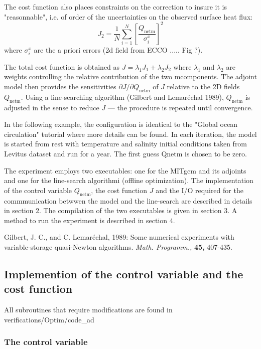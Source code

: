 The cost function also places constraints on the correction to insure it is
"reasonnable", i.e. of order of the uncertainties on the observed surface heat
flux: 
\begin{equation}
J_2 = \frac{1}{N} \sum_{i=1}^N \left[\frac{Q_\mathrm{netm}}{\sigma^x_i} \right]^2
\end{equation}
where $\sigma^x_i$ are the a priori errors (2d field from ECCO ..... Fig ?).

The total cost function is obtained as $J=\lambda_1 J_1+ \lambda_2 J_2$ where
$\lambda_1$ and $\lambda_2$ are weights controlling the relative contribution
of the two mcomponents. The adjoint model then provides the sensitivities
$\partial J/\partial Q_\mathrm{netm}$ of $J$ relative to the 2D fields
$Q_\mathrm{netm}$. Using a line-searching algorithm (Gilbert and Lemar\'{e}chal 1989),
$Q_\mathrm{netm}$ is adjusted in the sense to reduce $J$ --- the procedure is 
repeated until convergence.

In the following example, the configuration is identical to the "Global ocean circulation"
tutorial where more details can be found. In each iteration, the model is started from
rest with temperature and salinity initial conditions taken from Levitus dataset and run
for a year. The first guess Qnetm is chosen to be zero.

The experiment employs two executables: one for the MITgcm and its adjoints and 
one for the line-search algorithmi (offline optimization). The implementation of
the control variable $Q_\mathrm{netm}$, the cost function $J$ and the I/O required
for the commmunication betwwen the model and the line-search are described in details 
in section 2. The compilation of the two executables is given in section 3.
A method to run the experiment is described in section 4.

Gilbert, J. C., and C. Lemar\'echal, 1989: Some numerical experiments with
variable-storage quasi-Newton algorithms. \textit{Math. Programm.,}
\textbf{45,} 407-435.

\subsection{Implemention of the control variable and the cost function}

All subroutines that require modifications are found in verifications/Optim/code\_ad

\subsubsection{The control variable}

